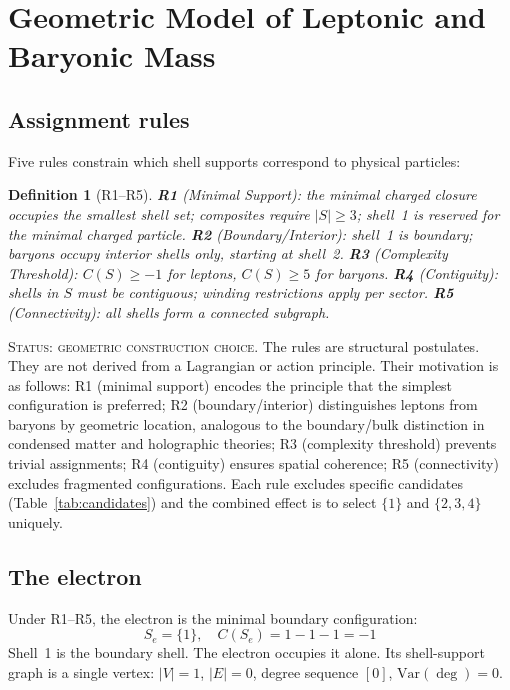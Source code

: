 \documentclass[12pt]{article}
\newtheorem{definition}[theorem]{Definition}
\begin{document}
\section{Geometric Model of Leptonic and Baryonic Mass}\label{sec:model}

\subsection{Assignment rules}

Five rules constrain which shell supports correspond to physical particles:

\begin{definition}[R1--R5]\label{def:rules}
\textbf{R1} (Minimal Support): the minimal charged closure occupies the smallest shell set; composites require $|S| \geq 3$; shell~1 is reserved for the minimal charged particle.
\textbf{R2} (Boundary/Interior): shell~1 is boundary; baryons occupy interior shells only, starting at shell~2.
\textbf{R3} (Complexity Threshold): $C(S) \geq -1$ for leptons, $C(S) \geq 5$ for baryons.
\textbf{R4} (Contiguity): shells in $S$ must be contiguous; winding restrictions apply per sector.
\textbf{R5} (Connectivity): all shells form a connected subgraph.
\end{definition}

\textsc{Status: geometric construction choice.} The rules are structural postulates. They are not derived from a Lagrangian or action principle. Their motivation is as follows: R1 (minimal support) encodes the principle that the simplest configuration is preferred; R2 (boundary/interior) distinguishes leptons from baryons by geometric location, analogous to the boundary/bulk distinction in condensed matter and holographic theories; R3 (complexity threshold) prevents trivial assignments; R4 (contiguity) ensures spatial coherence; R5 (connectivity) excludes fragmented configurations. Each rule excludes specific candidates (Table~\ref{tab:candidates}) and the combined effect is to select $\{1\}$ and $\{2,3,4\}$ uniquely.

\subsection{The electron}

Under R1--R5, the electron is the minimal boundary configuration:
\[
S_e = \{1\}, \quad C(S_e) = 1 - 1 - 1 = -1
\]
Shell~1 is the boundary shell. The electron occupies it alone. Its shell-support graph is a single vertex: $|V| = 1$, $|E| = 0$, degree sequence $[0]$, $\mathrm{Var}(\deg) = 0$.
\end{document}

